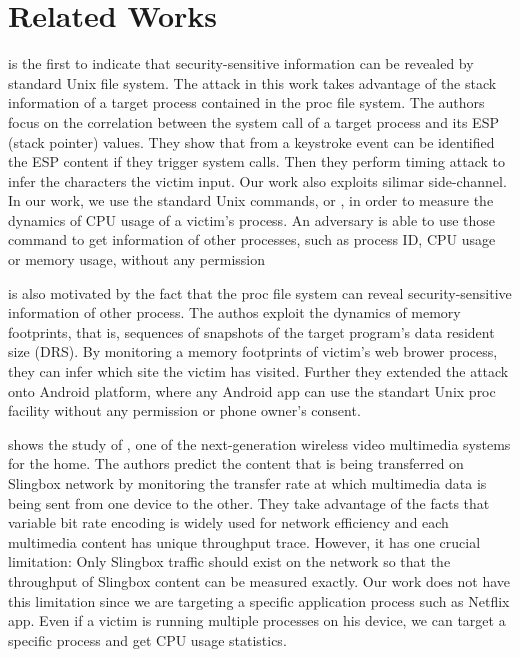 \section{Related Works}
\label{sec:relatedworks}

\cite{Zhang:2009} is the first to indicate that security-sensitive information can be revealed by standard Unix  file system. 
The attack in this work takes advantage of the stack information of a target process contained in the proc file system. 
The authors focus on the correlation between the system call of a target process and its ESP (stack pointer) values. 
They show that from a keystroke event can be identified the ESP content if they trigger system calls.
Then they perform timing attack to infer the characters the victim input. 
Our work also exploits silimar side-channel. 
In our work, we use the standard Unix commands,  or , in order to measure the dynamics of CPU usage of a victim's process. 
An adversary is able to use those command to get information of other processes, such as process ID, CPU usage or memory usage, without any permission 

\cite{jana:memento} is also motivated by the fact that the proc file system can reveal security-sensitive information of other process. 
The authos exploit the dynamics of memory footprints, that is, sequences of snapshots of the target program's data resident size (DRS).
By monitoring a memory footprints of victim's web brower process, they can infer which site the victim has visited. 
Further they extended the attack onto Android platform, where any Android app can use the standart Unix proc facility without any permission or phone owner's consent. 

\cite{Saponas07devicesthat} shows the study of \cite{slingbox}, one of the next-generation wireless video multimedia systems for the home. 
The authors predict the content that is being transferred on Slingbox network by monitoring the transfer rate at which multimedia data is being sent from one device to the other. 
They take advantage of the facts that variable bit rate encoding is widely used for network efficiency and each multimedia content has unique throughput trace. 
However, it has one crucial limitation: Only Slingbox traffic should exist on the network so that the throughput of Slingbox content can be measured exactly. 
Our work does not have this limitation since we are targeting a specific application process such as Netflix app.
Even if a victim is running multiple processes on his device, we can target a specific process and get CPU usage statistics. 


